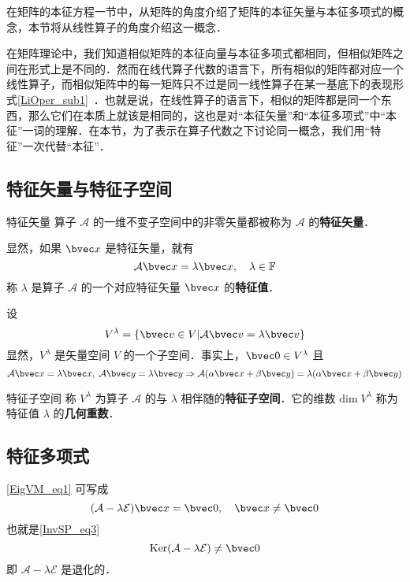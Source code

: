 在矩阵的本征方程一节中，从矩阵的角度介绍了矩阵的本征矢量与本征多项式的概念，本节将从线性算子的角度介绍这一概念．

在矩阵理论中，我们知道相似矩阵的本征向量与本征多项式都相同，但相似矩阵之间在形式上是不同的．然而在线代算子代数的语言下，所有相似的矩阵都对应一个线性算子，而相似矩阵中的每一矩阵只不过是同一线性算子在某一基底下的表现形式\autoref{LiOper_sub1}~．也就是说，在线性算子的语言下，相似的矩阵都是同一个东西，那么它们在本质上就该是相同的，这也是对“本征矢量”和“本征多项式”中“本征”一词的理解．在本节，为了表示在算子代数之下讨论同一概念，我们用“特征”一次代替“本征”．
\subsection{特征矢量与特征子空间}
\begin{definition}{特征矢量}
算子 $\mathcal{A}$ 的一维不变子空间中的非零矢量都被称为 $\mathcal{A}$ 的\textbf{特征矢量}．
\end{definition}
显然，如果 $\bvec x$ 是特征矢量，就有
\begin{equation}\label{EigVM_eq1}
\mathcal{A}\bvec x=\lambda \bvec x,\quad \lambda\in\mathbb{F}
\end{equation}
称 $\lambda$ 是算子 $\mathcal{A}$ 的一个对应特征矢量 $\bvec x$ 的\textbf{特征值}．

设
\begin{equation}
V^{\lambda}=\{\bvec v\in V|\mathcal{A}\bvec v=\lambda \bvec v\}
\end{equation}
显然，$V^{\lambda}$ 是矢量空间 $V$ 的一个子空间．事实上，$\bvec 0\in V^{\lambda}$ 且
\begin{equation}
\mathcal{A}\bvec x=\lambda \bvec x,\;\mathcal{A}\bvec y=\lambda \bvec y\Rightarrow\mathcal{A}(\alpha\bvec x+\beta\bvec y)=\lambda(\alpha\bvec x+\beta \bvec y)
\end{equation}
\begin{definition}{特征子空间}
称 $V^{\lambda}$ 为算子 $\mathcal{A}$ 的与 $\lambda$ 相伴随的\textbf{特征子空间}．它的维数 $\mathrm{dim}\;V^{\lambda}$ 称为特征值 $\lambda$ 的\textbf{几何重数}． 
\end{definition}
\subsection{特征多项式}
\autoref{EigVM_eq1} 可写成
\begin{equation}
(\mathcal{A-\lambda E})\bvec x=\bvec 0,\quad \bvec x\neq\bvec 0
\end{equation}
也就是\autoref{InvSP_eq3}~ 
\begin{equation}
\mathrm{Ker(\mathcal{A}-\lambda\mathcal{E})}\neq\bvec 0
\end{equation}
即 $\mathcal{A-\lambda E}$ 是退化的．
